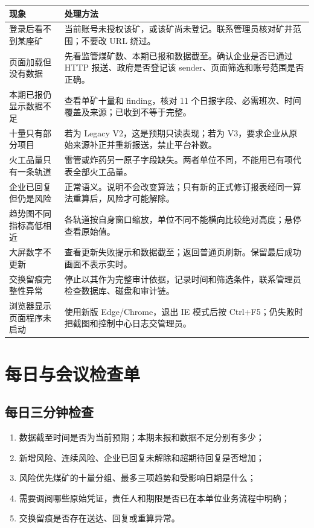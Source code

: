 \documentclass[UTF8,openany,zihao=-4,fontset=none]{ctexbook}
\begin{document}
\begin{longtable}{P{47mm}P{96mm}}
\toprule
\textbf{现象} & \textbf{处理方法}\\
\midrule
登录后看不到某座矿 & 当前账号未授权该矿，或该矿尚未登记。联系管理员核对矿井范围；不要改 URL 绕过。\\
页面加载但没有数据 & 先看监管煤矿数、本期已报和数据截至。确认企业是否已通过 HTTP 报送、政府是否登记该 sender、页面筛选和账号范围是否正确。\\
本期已报仍显示数据不足 & 查看单矿十量和 finding，核对 11 个日报字段、必需班次、时间覆盖及来源；已收到不等于完整。\\
十量只有部分项目 & 若为 Legacy V2，这是预期只读表现；若为 V3，要求企业从原始来源补正并重新报送，禁止平台补数。\\
火工品量只有一条轨道 & 雷管或炸药另一原子字段缺失。两者单位不同，不能用已有项代表全部火工品量。\\
企业已回复但仍是风险 & 正常语义。说明不会改变算法；只有新的正式修订报表经同一算法重算后，风险才可能解除。\\
趋势图不同指标高低相近 & 各轨道按自身窗口缩放，单位不同不能横向比较绝对高度；悬停查看原始值。\\
大屏数字不更新 & 查看更新失败提示和数据截至；返回普通页刷新。保留最后成功画面不表示实时。\\
交换留痕完整性异常 & 停止以其作为完整审计依据，记录时间和筛选条件，联系管理员检查数据库、磁盘和审计链。\\
浏览器显示页面程序未启动 & 使用新版 Edge/Chrome，退出 IE 模式后按 Ctrl+F5；仍失败时把截图和控制中心日志交管理员。\\
\bottomrule
\end{longtable}

\chapter{每日与会议检查单}

\section{每日三分钟检查}

\begin{enumerate}
  \item 数据截至时间是否为当前预期；本期未报和数据不足分别有多少；
  \item 新增风险、连续风险、企业已回复未解除和超期待回复是否增加；
  \item 风险优先煤矿的十量分组、最多三项趋势和受影响日期是什么；
  \item 需要调阅哪些原始凭证，责任人和期限是否已在本单位业务流程中明确；
  \item 交换留痕是否存在送达、回复或重算异常。
\end{enumerate}
\end{document}
